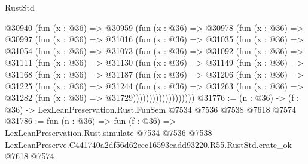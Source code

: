 \begin{lexlean}{RustStd}
\begin{coremodule}
  @30940
    (fun (x : @36) =>
    @30959
      (fun (x : @36) =>
      @30978
        (fun (x : @36) =>
        @30997
          (fun (x : @36) =>
          @31016
            (fun (x : @36) =>
            @31035
              (fun (x : @36) =>
              @31054
                (fun (x : @36) =>
                @31073
                  (fun (x : @36) =>
                  @31092
                    (fun (x : @36) =>
                    @31111
                      (fun (x : @36) =>
                      @31130
                        (fun (x : @36) =>
                        @31149
                          (fun (x : @36) =>
                          @31168
                            (fun (x : @36) =>
                            @31187
                              (fun (x : @36) =>
                              @31206
                                (fun (x : @36) =>
                                @31225
                                  (fun (x : @36) =>
                                  @31244
                                    (fun (x : @36) =>
                                    @31263
                                      (fun (x : @36) =>
                                      @31282 (fun (x : @36) => @31729)))))))))))))))))))
@31776 := (n : @36) -> (f : @36) -> LexLeanPreservation.Rust.FunSem @7534 @7536 @7538 @7618 @7574
@31786 := fun (n : @36) =>
  fun (f : @36) =>
  LexLeanPreservation.Rust.simulate
    @7534
    @7536
    @7538
    LexLeanPreserve.C441740a2df56d62eec16593cadd93220.R55.RustStd.crate_ok
    @7618
    @7574
\end{coremodule}
\end{lexlean}
